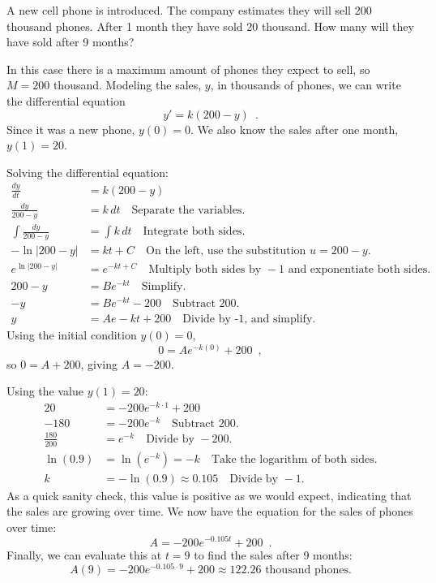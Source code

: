 \begin{example}
A new cell phone is introduced. The company estimates they will sell 200 thousand phones. After 1 month they have sold 20 thousand. How many will they have sold after 9 months?

\begin{solution}
In this case there is a maximum amount of phones they expect to sell, so $M=200$ thousand. Modeling the sales, $y$, in thousands of phones, we can write the differential equation
$$y'=k(200-y) \enspace .$$
Since it was a new phone, $y(0)=0$. We also know the sales after one month, $y(1)=20$.

Solving the differential equation:
\begin{align*}
  \frac{dy}{dt}         &= k(200-y) \\
  \frac{dy}{200-y}      &= k\,dt  \quad \text{Separate the variables.}\\
  \int\frac{dy}{200-y}  &= \int k\,dt  \quad \text{Integrate both sides.}\\
  -\ln|200-y|           &= kt+C \quad \text{On the left, use the substitution } u=200-y.\\
  e^{\ln|200-y|}        &= e^{-kt+C} \quad \text{Multiply both sides by } -1 \text{ and exponentiate both sides.} \\
  200-y                 &= Be^{-kt} \quad \text{Simplify.}\\
  -y                    &= Be^{-kt} - 200 \quad \text{Subtract 200.}\\
  y                     &= Ae-kt+200 \quad \text{Divide by -1, and simplify.}
\end{align*}
Using the initial condition $y(0)=0$,
$$0=Ae^{-k(0)} + 200 \enspace ,$$
so $0=A+200$, giving $A=-200$.

Using the value $y(1)=20$:
\begin{align*}
  20              &= -200e^{-k\cdot 1}+200 \\
  -180            &= -200e^{-k} \quad \text{Subtract 200.}\\
  \frac{180}{200} &= e^{-k} \quad \text{Divide  by } -200. \\
  \ln(0.9)        &= \ln\left(e^{-k}\right) = -k \quad \text{Take the logarithm of both sides.}\\
  k               &= -\ln(0.9) \approx   0.105 \quad \text{Divide by } -1.
\end{align*}
As a quick sanity check, this value is positive as we would expect, indicating that the sales are growing over time. We now have the equation for the sales of phones over time:
$$A=-200e^{-0.105t}+200 \enspace .$$
Finally, we can evaluate this at $t=9$ to find the sales after 9 months:
$$A(9) = -200e^{-0.105\cdot 9} + 200  \approx   122.26 \text{ thousand phones.}$$
\end{solution}\end{example}

